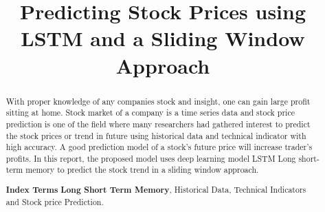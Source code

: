 \documentclass[5p,,preprint,12pt,twocolumn]{elsarticle}
\begin{document}
\begin{frontmatter}
	
\title{Predicting Stock Prices using LSTM and a Sliding Window Approach
}
    
    

\begin{abstract}
With proper knowledge of any companies stock and insight, one can gain large profit sitting at home. Stock market of a company is a time series data and stock price prediction is one of the field where many researchers had gathered interest to predict the stock prices or trend in future using historical data and technical indicator with high accuracy. A good prediction model of a stock's future price will increase trader's profits. In this report, the proposed model uses deep learning model LSTM {\textemdash} Long short-term memory to predict the stock trend in a sliding window approach.

\textbf{Index Terms}{\textendash} \textbf{Long Short Term Memory}, Historical Data, Technical Indicators and Stock price Prediction.
\end{abstract}
\end{frontmatter}
    
\end{document}
